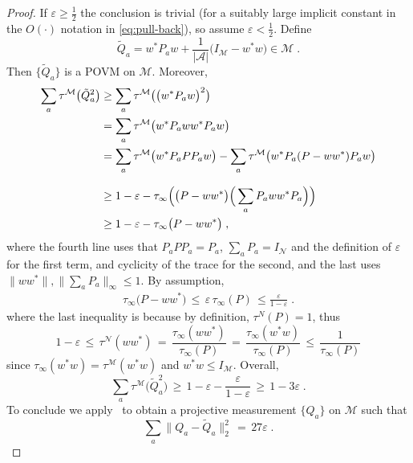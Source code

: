 \documentclass[11pt]{article}
\theoremstyle{definition}
\newcommand{\Id}{\ensuremath{I}}
\newcommand{\mA}{\ensuremath{\mathcal{A}}}
\newcommand{\mM}{\ensuremath{\mathcal{M}}}
\newcommand{\cM}{\ensuremath{\mathcal{M}}}
\newcommand{\eps}{\varepsilon}
\newcommand{\mN}{\mathcal{N}}
\begin{document}
\begin{proof}
If $\eps\geq \frac{1}{2}$ the conclusion is trivial (for a suitably large implicit constant in the $O(\cdot)$ notation in \eqref{eq:pull-back}), so assume $\eps<\frac{1}{2}$. 
Define 
\[\tilde{Q}_a = w^* P_a w  + \frac{1}{|\mA|}\big(\Id_\mM - w^* w\big) \in \mM\;.\]
Then $\{\tilde{Q}_a\}$ is a POVM on $\mM$. Moreover, 
\begin{align*}
\sum_a \tau^\mM \big( \tilde{Q}_a^2 \big) &\geq \sum_a \tau^\mM \big( \big(w^* P_a w \big)^2 \big) \\
&= \sum_a \tau^\mM \big(  w^* P_a w w^*P_a w \big)\\
&= \sum_a \tau^\mM \big(  w^* P_a  P P_a w \big) - \sum_a \tau^\mM \big( w^* P_a  ( P - w w^*) P_a w \big)\\
\intertext{
\hnote{I don't get this next line... how did $\tau_\infty$ show up?}\tnote{By definition, $\mM$ is seen as a sub-algebra of $\mM_\infty$, and $\tau_\infty$ restricted to that sub-algebra is $\tau^\cM$. So, whenever $M\in \mM$, $\tau^\mM(M)=\tau_\infty(\mM)$ is a legal ``shortcut'' in the writing. It's this sentence about the ``corner'' in the prelims...should we add something more explicit? Or explain this line here more, since it's the first time we make the manipulation? }
}
&\geq 1 - \eps -  \tau_\infty\Big(\big( P - w w^*\big)\Big(\sum_a  P_a w w^* P_a\Big)\Big)\\ 
&\geq 1- \eps- \tau_\infty\big( P- w w^*\big)\;,
\end{align*}
where the fourth line uses that $P_aPP_a=P_a$, $\sum_a P_a = \Id_\mN$ and the definition of $\eps$ for the first term, and cyclicity of the trace for the second, and the last uses $\|ww^*\|,\|\sum_a P_a\|_\infty\leq 1$. By assumption, 
\begin{align*}
\tau_\infty\big( P- w w^*\big) \,\leq\, \eps\, \tau_\infty(P)\,\leq \frac{\eps}{1-\eps}\;.
\end{align*}
where the last inequality is because by definition, $\tau^N(P)=1$, thus
\[1-\eps \,\leq\, \tau^\mN(ww^*) \,=\, \frac{\tau_\infty(ww^*)}{\tau_\infty(P)}\,=\, \frac{\tau_\infty(w^*w)}{\tau_\infty(P)}  \,\leq\, \frac{1}{\tau_\infty(P)}\]
since $\tau_\infty(w^* w) = \tau^\mM(w^* w)$ and $w^*w\leq I_\mM$. Overall, 
\[ \sum_a \tau^\mM \big( \tilde{Q}_a^2 \big) \,\geq\, 1-\eps-\frac{\eps}{1-\eps}\,\geq\, 1-3\eps\;.\]
To conclude we apply~\cite[Theorem 1.2]{de2021orthogonalization} to obtain a projective measurement $\{Q_a\}$ on $\mM$ such that 
\begin{equation*}
\sum_a \big\|{Q}_a - \tilde{Q}_a \big\|^2_2 \,=\, 27\eps\;.

\end{equation*}
\end{proof}
\end{document}
